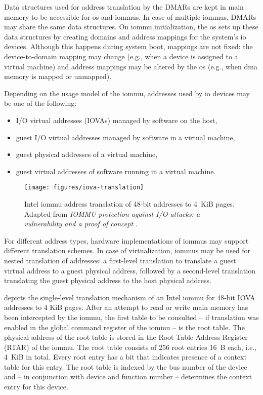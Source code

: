 Data structures used for address translation by the DMARs are kept in main
memory to be accessible for \ac{os} and \acp{iommu}. In case of multiple
\acp{iommu}, DMARs may share the same data structures. On \ac{iommu}
initialization, the \ac{os} sets up these data structures by creating domains
and address mappings for the system's \ac{io} devices. Although this happens
during system boot, mappings are not fixed: the device-to-domain mapping may
change (e.g., when a device is assigned to a virtual machine) and address
mappings may be altered by the \ac{os} (e.g., when \ac{dma} memory is mapped or
unmapped).

Depending on the usage model of the \ac{iommu}, addresses used by \ac{io}
devices may be one of the following:

\begin{itemize}
    \item I/O virtual addresses (IOVAs) managed by software on the host,
    \item guest I/O virtual addresses managed by software in a virtual
        machine,
    \item guest physical addresses of a virtual machine,
    \item guest virtual addresses of software running in a virtual machine.
\end{itemize}

\begin{figure}[!b]
    \centering
    \texttt{[image: figures/iova-translation]}
    \caption{Intel \acs{iommu} address translation of 48-bit addresses to 4~KiB
    pages. Adapted from \textit{IOMMU protection against I/O attacks: a
    vulnerability and a proof of concept} \cite{morgan2018iommu}.}
    \label{fig:translation}
\end{figure}

For different address types, hardware implementations of \acp{iommu} may support
different translation schemes. In case of virtualization, \acp{iommu} may be
used for nested translation of addresses: a first-level translation to translate
a guest virtual address to a guest physical address, followed by a second-level
translation translating the guest physical address to the host physical address.

 depicts the single-level translation mechanism of an
Intel \ac{iommu} for 48-bit IOVA addresses to 4 KiB pages. After an attempt to
read or write main memory has been intercepted by the \ac{iommu}, the first
table to be consulted -- if translation was enabled in the global command
register of the \ac{iommu} -- is the root table. The physical address of the
root table is stored in the Root Table Address Register (RTAR) of the
\ac{iommu}. The root table consists of 256 root entries 16~B each, i.e., 4~KiB
in total. Every root entry has a bit that indicates presence of a context table
for this entry. The root table is indexed by the bus number of the device and --
in conjunction with device and function number -- determines the context entry
for this device.

